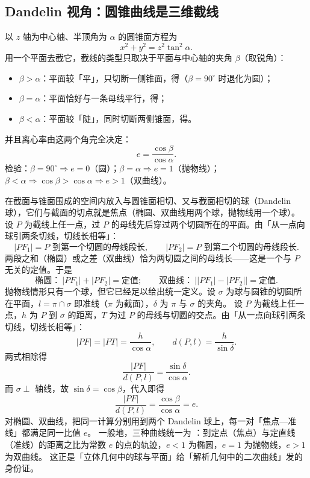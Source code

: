 \begin{explore}
\subsection{Dandelin 视角：圆锥曲线是三维截线}


以 $z$ 轴为中心轴、半顶角为 $\alpha$ 的圆锥面方程为
\[
  x^2+y^2=z^2\tan^2\alpha .
\]
用一个平面去截它，截线的类型只取决于平面与中心轴的夹角 $\beta$（取锐角）：
\begin{itemize}
  \item $\beta>\alpha$：平面较「平」，只切断一侧锥面，得（$\beta=90^\circ$ 时退化为圆）；
  \item $\beta=\alpha$：平面恰好与一条母线平行，得；
  \item $\beta<\alpha$：平面较「陡」，同时切断两侧锥面，得。
\end{itemize}
并且离心率由这两个角完全决定：
\[
  e=\frac{\cos\beta}{\cos\alpha}.
\]
检验：$\beta=90^\circ\Rightarrow e=0$（圆）；$\beta=\alpha\Rightarrow e=1$（抛物线）；$\beta<\alpha\Rightarrow\cos\beta>\cos\alpha\Rightarrow e>1$（双曲线）。

在截面与锥面围成的空间内放入与圆锥面相切、又与截面相切的球（Dandelin 球），它们与截面的切点就是焦点（椭圆、双曲线用两个球，抛物线用一个球）。
设 $P$ 为截线上任一点，过 $P$ 的母线先后穿过两个切圆所在的平面。由「从一点向球引两条切线，切线长相等」：
\[
  |PF_1|=P\text{ 到第一个切圆的母线段长},\qquad |PF_2|=P\text{ 到第二个切圆的母线段长}.
\]
两段之和（椭圆）或之差（双曲线）恰为两切圆之间的母线长——这是一个与 $P$ 无关的定值。于是
\[
  \text{椭圆：}\ |PF_1|+|PF_2|=\text{定值};\qquad
  \text{双曲线：}\ \bigl||PF_1|-|PF_2|\bigr|=\text{定值}.
\]
抛物线情形只有一个球，但它已经足以给出统一定义。设 $\sigma$ 为球与圆锥的切圆所在平面，$l=\pi\cap\sigma$ 即准线（$\pi$ 为截面），$\delta$ 为 $\pi$ 与 $\sigma$ 的夹角。
设 $P$ 为截线上任一点，$h$ 为 $P$ 到 $\sigma$ 的距离，$T$ 为过 $P$ 的母线与切圆的交点。由「从一点向球引两条切线，切线长相等」：
\[
  |PF|=|PT|=\frac{h}{\cos\alpha},
  \qquad
  d(P,l)=\frac{h}{\sin\delta}.
\]
两式相除得
\[
  \frac{|PF|}{d(P,l)}=\frac{\sin\delta}{\cos\alpha}.
\]
而 $\sigma\perp$ 轴线，故 $\sin\delta=\cos\beta$，代入即得
\[
  \frac{|PF|}{d(P,l)}=\frac{\cos\beta}{\cos\alpha}=e.
\]
对椭圆、双曲线，把同一计算分别用到两个 Dandelin 球上，每一对「焦点—准线」都满足同一比值 $e$。
一般地，三种曲线统一为 ：到定点（焦点）与定直线（准线）的距离之比为常数 $e$ 的点的轨迹，$e<1$ 为椭圆，$e=1$ 为抛物线，$e>1$ 为双曲线。
这正是「立体几何中的球与平面」给「解析几何中的二次曲线」发的身份证。


\end{explore}
